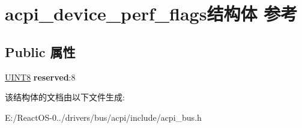 \hypertarget{structacpi__device__perf__flags}{}\section{acpi\+\_\+device\+\_\+perf\+\_\+flags结构体 参考}
\label{structacpi__device__perf__flags}
\subsection*{Public 属性}
\begin{DoxyCompactItemize}
\item 
\mbox{\label{structacpi__device__perf__flags_aa8fd5165288092d41f7d3cb127bfd823}} 
\hyperlink{_processor_bind_8h_ab27e9918b538ce9d8ca692479b375b6a}{U\+I\+N\+T8} {\bfseries reserved}\+:8
\end{DoxyCompactItemize}


该结构体的文档由以下文件生成\+:\begin{DoxyCompactItemize}
\item 
E\+:/\+React\+O\+S-\/0../drivers/bus/acpi/include/acpi\+\_\+bus.\+h\end{DoxyCompactItemize}
